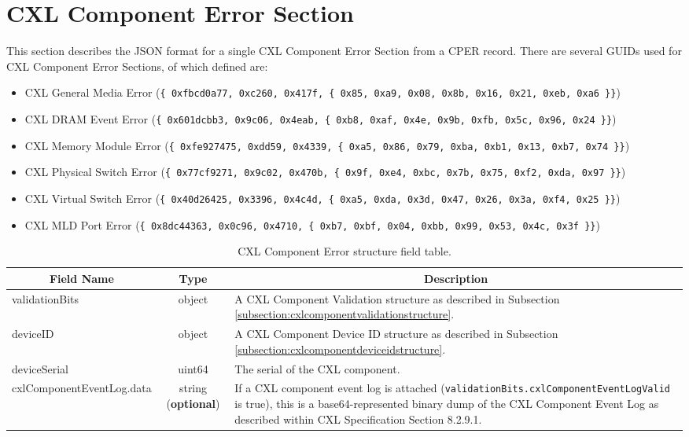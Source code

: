 \documentclass{report}
\newcommand*{\thead}[1]{\multicolumn{1}{|c|}{\bfseries #1}}
\newcommand*{\jsontable}[1]{
    \begin{table}[!ht]
    \label{#1}
    \centering
    \begin{adjustbox}{center}
    \begin{tabular}{|l|c|p{8cm}|}
    \hline
    \thead{Field Name} & \thead{Type} & \thead{Description} \\
    \hline
}
\newcommand*{\jsontableend}[1]{
    \hline
    \end{tabular}
    \end{adjustbox}
    \caption{#1}
    \label{table:#1}
    \end{table}
    \FloatBarrier
}
\begin{document}
\section{CXL Component Error Section}
\label{section:cxlcomponenterrorsection}
This section describes the JSON format for a single CXL Component Error Section from a CPER record. There are several GUIDs used for CXL Component Error Sections, of which defined are:\\
\begin{itemize}
    \item CXL General Media Error (\texttt{\{ 0xfbcd0a77, 0xc260, 0x417f, \{ 0x85, 0xa9, 0x08, 0x8b, 0x16, 0x21, 0xeb, 0xa6 \}\}})\\
    \item CXL DRAM Event Error (\texttt{\{ 0x601dcbb3, 0x9c06, 0x4eab, \{ 0xb8, 0xaf, 0x4e, 0x9b, 0xfb, 0x5c, 0x96, 0x24 \}\}})\\
    \item CXL Memory Module Error (\texttt{\{ 0xfe927475, 0xdd59, 0x4339, \{ 0xa5, 0x86, 0x79, 0xba, 0xb1, 0x13, 0xb7, 0x74 \}\}})\\
    \item CXL Physical Switch Error (\texttt{\{ 0x77cf9271, 0x9c02, 0x470b, \{ 0x9f, 0xe4, 0xbc, 0x7b, 0x75, 0xf2, 0xda, 0x97 \}\}})\\
    \item CXL Virtual Switch Error (\texttt{\{ 0x40d26425, 0x3396, 0x4c4d, \{ 0xa5, 0xda, 0x3d, 0x47, 0x26, 0x3a, 0xf4, 0x25 \}\}})\\
    \item CXL MLD Port Error (\texttt{\{ 0x8dc44363, 0x0c96, 0x4710, \{ 0xb7, 0xbf, 0x04, 0xbb, 0x99, 0x53, 0x4c, 0x3f \}\}})\\
\end{itemize}
\jsontable{table:cxlcomponenterrorsection}
validationBits & object & A CXL Component Validation structure as described in Subsection \ref{subsection:cxlcomponentvalidationstructure}.\\
\hline
deviceID & object & A CXL Component Device ID structure as described in Subsection \ref{subsection:cxlcomponentdeviceidstructure}.\\
\hline
deviceSerial & uint64 & The serial of the CXL component.\\
\hline
cxlComponentEventLog.data & string (\textbf{optional}) & If a CXL component event log is attached (\texttt{validationBits.cxlComponentEventLogValid} is true), this is a base64-represented binary dump of the CXL Component Event Log as described within CXL Specification Section 8.2.9.1.\\
\jsontableend{CXL Component Error structure field table.}
\end{document}
